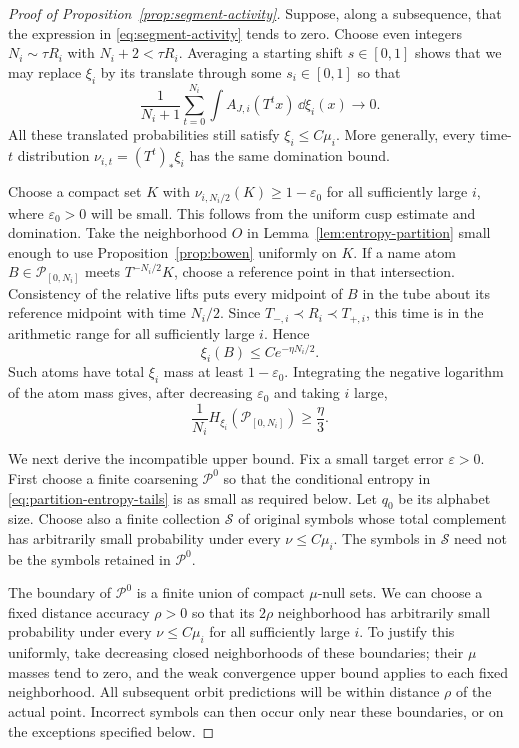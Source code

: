 \begin{proof}[Proof of Proposition~\ref{prop:segment-activity}]
Suppose, along a subsequence, that the expression in
\eqref{eq:segment-activity} tends to zero.  Choose even integers
$N_i\sim\tau R_i$ with $N_i+2<\tau R_i$.  Averaging a starting shift
$s\in[0,1]$ shows that we may replace $\xi_i$ by its translate through
some $s_i\in[0,1]$ so that
\begin{equation}\label{eq:vanishing-discrete-activity}
 \frac1{N_i+1}\sum_{t=0}^{N_i}
 \int A_{J,i}(T^t x)\,\dd\xi_i(x)\longrightarrow0.
\end{equation}
All these translated probabilities still satisfy $\xi_i\leq C\mu_i$.
More generally, every time-$t$ distribution
$\nu_{i,t}=(T^t)_*\xi_i$ has the same domination bound.

Choose a compact set $K$ with $\nu_{i,N_i/2}(K)\geq1-\varepsilon_0$ for
all sufficiently large $i$, where $\varepsilon_0>0$ will be small.  This
follows from the uniform cusp estimate and domination.  Take the
neighborhood $O$ in Lemma~\ref{lem:entropy-partition} small enough to use
Proposition~\ref{prop:bowen} uniformly on $K$.
If a name atom $B\in\mathcal P_{[0,N_i]}$ meets $T^{-N_i/2}K$, choose a
reference point in that intersection.  Consistency of the relative lifts
puts every midpoint of $B$ in the tube about its reference midpoint with
time $N_i/2$.  Since $T_{-,i}\prec R_i\prec T_{+,i}$, this time is in the
arithmetic range for all sufficiently large $i$.  Hence
\[
 \xi_i(B)\leq C e^{-\eta N_i/2}.
\]
Such atoms have total $\xi_i$ mass at least $1-\varepsilon_0$.
Integrating the negative logarithm of the atom mass gives, after decreasing
$\varepsilon_0$ and taking $i$ large,
\begin{equation}\label{eq:name-entropy-lower}
 \frac1{N_i}H_{\xi_i}(\mathcal P_{[0,N_i]})\geq\frac\eta3.
\end{equation}

We next derive the incompatible upper bound.  Fix a small target error
$\varepsilon>0$.  First choose a finite coarsening $\mathcal P^0$ so that
the conditional entropy in \eqref{eq:partition-entropy-tails} is as small
as required below.  Let $q_0$ be its alphabet size.  Choose also a finite
collection $\mathcal S$ of original symbols whose total complement has
arbitrarily small probability under every $\nu\leq C\mu_i$.  The symbols
in $\mathcal S$ need not be the symbols retained in $\mathcal P^0$.

The boundary of $\mathcal P^0$ is a finite union of compact $\mu$-null
sets.  We can choose a fixed distance accuracy $\rho>0$ so that its
$2\rho$ neighborhood has arbitrarily small probability under every
$\nu\leq C\mu_i$ for all sufficiently large $i$.  To justify this
uniformly, take decreasing closed neighborhoods of these boundaries;
their $\mu$ masses tend to zero, and the weak convergence upper bound
applies to each fixed neighborhood.  All subsequent orbit predictions
will be within distance $\rho$ of the actual point.  Incorrect symbols
can then occur only near these boundaries, or on the exceptions specified
below.


\end{proof}

